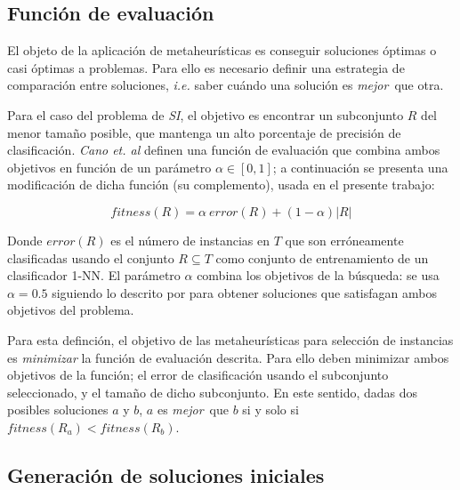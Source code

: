 \subsection{Función de evaluación}

El objeto de la aplicación de metaheurísticas es conseguir soluciones óptimas o casi óptimas a problemas. Para ello es necesario definir una estrategia de comparación entre soluciones, \emph{i.e.} saber cuándo una solución es \guillemotleft\emph{mejor}\guillemotright\ que otra.

Para el caso del problema de \emph{SI}, el objetivo es encontrar un subconjunto $R$ del menor tamaño posible, que mantenga un alto porcentaje de precisión de clasificación. \emph{Cano et. al} \cite{cano2003using} definen una función de evaluación que combina ambos objetivos en función de un parámetro $\alpha \in [0,1]$; a continuación se presenta una modificación de dicha función (su complemento), usada en el presente trabajo:

\begin{equation}
\mathit{fitness}(R) = \alpha\ \mathit{error}(R) + (1 - \alpha) \vert R \vert
\end{equation}

Donde $\mathit{error}(R)$ es el número de instancias en $T$ que son erróneamente clasificadas usando el conjunto $R \subseteq T$ como conjunto de entrenamiento de un clasificador 1-NN. El parámetro $\alpha$ combina los objetivos de la búsqueda: se usa $\alpha = 0.5$ siguiendo lo descrito por \cite{cano2003using} para obtener soluciones que satisfagan ambos objetivos del problema.

Para esta definción, el objetivo de las metaheurísticas para selección de instancias es \emph{minimizar} la función de evaluación descrita. Para ello deben minimizar ambos objetivos de la función; el error de clasificación usando el subconjunto seleccionado, y el tamaño de dicho subconjunto. En este sentido, dadas dos posibles soluciones $a$ y $b$, $a$ es \guillemotleft\emph{mejor}\guillemotright\ que $b$ si y solo si $\mathit{fitness}(R_a) < \mathit{fitness}(R_b)$.

\subsection{Generación de soluciones iniciales}
\label{generacion-sol-inic}

